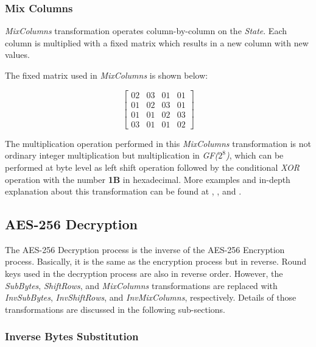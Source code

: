 \documentclass[a4paper, 10pt]{article}
\begin{document}
\begin{multicols}{2}
            \subsubsection{Mix Columns}
            \label{sec:mixcolumns}

            \textit{MixColumns} transformation operates column-by-column on the \textit{State}. Each column is multiplied with a fixed matrix which results in a new column with new values.

            The fixed matrix used in \textit{MixColumns} is shown below:

            \begin{equation}
            \begin{bmatrix}
                02 & 03 & 01 & 01\\
                01 & 02 & 03 & 01\\
                01 & 01 & 02 & 03\\
                03 & 01 & 01 & 02
            \end{bmatrix}
            \label{equ:mixcolumns-matrix}
        \end{equation}

        The multiplication operation performed in this \textit{MixColumns} transformation is not ordinary integer multiplication but multiplication in \textit{GF($2^{8}$)}, which can be performed at byte level as left shift operation followed by the conditional \textit{XOR} operation with the number \textbf{1B} in hexadecimal. More examples and in-depth explanation about this transformation can be found at \cite{AES}, \cite{sam-mix-columns}, and \cite{understand_mixcol}.

            \subsection{AES-256 Decryption}

	The AES-256 Decryption process is the inverse of the AES-256 Encryption process. Basically, it is the same as the encryption process but in reverse. Round keys used in the decryption process are also in reverse order. However, the \textit{SubBytes}, \textit{ShiftRows}, and \textit{MixColumns} transformations are replaced with \textit{InvSubBytes}, \textit{InvShiftRows}, and \textit{InvMixColumns}, respectively. Details of those transformations are discussed in the following sub-sections.

            \subsubsection{Inverse Bytes Substitution}


\end{multicols}
\end{document}
